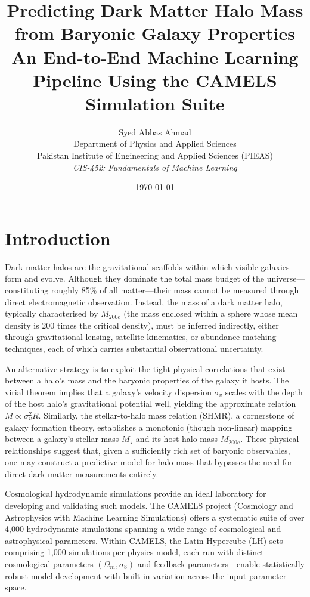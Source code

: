 \documentclass[12pt, a4paper]{article}
\title{%
  \textbf{Predicting Dark Matter Halo Mass from Baryonic Galaxy Properties}\\[6pt]
  \large An End-to-End Machine Learning Pipeline Using the CAMELS Simulation Suite
}
\author{%
  Syed Abbas Ahmad\\[4pt]
  \normalsize Department of Physics and Applied Sciences\\
  \normalsize Pakistan Institute of Engineering and Applied Sciences (PIEAS)\\[4pt]
  \normalsize \textit{CIS-452: Fundamentals of Machine Learning}
}
\date{\today}
\newcommand{\Mhalo}{M_{200\mathrm{c}}}
\newcommand{\sigmav}{\sigma_v}
\newcommand{\Mstar}{M_\star}
\begin{document}
\maketitle

\section{Introduction}
\label{sec:introduction}

Dark matter halos are the gravitational scaffolds within which visible galaxies form and evolve.  Although they dominate the total mass budget of the universe---constituting roughly 85\% of all matter---their mass cannot be measured through direct electromagnetic observation.  Instead, the mass of a dark matter halo, typically characterised by $\Mhalo$ (the mass enclosed within a sphere whose mean density is 200 times the critical density), must be inferred indirectly, either through gravitational lensing, satellite kinematics, or abundance matching techniques, each of which carries substantial observational uncertainty.

An alternative strategy is to exploit the tight physical correlations that exist between a halo's mass and the baryonic properties of the galaxy it hosts.  The virial theorem implies that a galaxy's velocity dispersion $\sigmav$ scales with the depth of the host halo's gravitational potential well, yielding the approximate relation $M \propto \sigmav^2 R$.  Similarly, the stellar-to-halo mass relation (SHMR), a cornerstone of galaxy formation theory, establishes a monotonic (though non-linear) mapping between a galaxy's stellar mass $\Mstar$ and its host halo mass $\Mhalo$.  These physical relationships suggest that, given a sufficiently rich set of baryonic observables, one may construct a predictive model for halo mass that bypasses the need for direct dark-matter measurements entirely.

Cosmological hydrodynamic simulations provide an ideal laboratory for developing and validating such models.  The CAMELS project (Cosmology and Astrophysics with Machine Learning Simulations) offers a systematic suite of over 4,000 hydrodynamic simulations spanning a wide range of cosmological and astrophysical parameters.  Within CAMELS, the Latin Hypercube (LH) sets---comprising 1,000 simulations per physics model, each run with distinct cosmological parameters $(\Omega_m, \sigma_8)$ and feedback parameters---enable statistically robust model development with built-in variation across the input parameter space.
\end{document}
